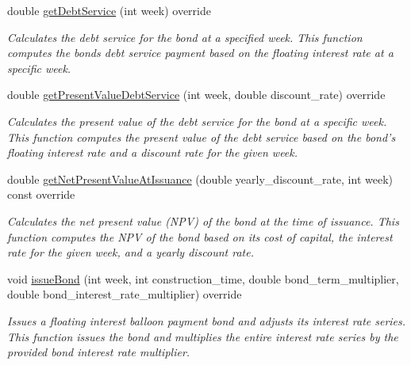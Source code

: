 \begin{DoxyCompactItemize}
double \mbox{\hyperlink{classFloatingInterestBalloonPaymentBond_a0009a0b12e0ebeb15952561513ddc901}{get\+Debt\+Service}} (int week) override
\begin{DoxyCompactList}\small\item\em Calculates the debt service for the bond at a specified week. This function computes the bond\textquotesingle{}s debt service payment based on the floating interest rate at a specific week. \end{DoxyCompactList}\item 
double \mbox{\hyperlink{classFloatingInterestBalloonPaymentBond_a91b2fef92f90049a3ba13bcd27c0eff2}{get\+Present\+Value\+Debt\+Service}} (int week, double discount\+\_\+rate) override
\begin{DoxyCompactList}\small\item\em Calculates the present value of the debt service for the bond at a specific week. This function computes the present value of the debt service based on the bond’s floating interest rate and a discount rate for the given week. \end{DoxyCompactList}\item 
double \mbox{\hyperlink{classFloatingInterestBalloonPaymentBond_a90205e26e09eef1227f8c0671ca4fce2}{get\+Net\+Present\+Value\+At\+Issuance}} (double yearly\+\_\+discount\+\_\+rate, int week) const override
\begin{DoxyCompactList}\small\item\em Calculates the net present value (N\+PV) of the bond at the time of issuance. This function computes the N\+PV of the bond based on its cost of capital, the interest rate for the given week, and a yearly discount rate. \end{DoxyCompactList}\item 
void \mbox{\hyperlink{classFloatingInterestBalloonPaymentBond_a4cf110f320c92f5eca9aed952e0b527a}{issue\+Bond}} (int week, int construction\+\_\+time, double bond\+\_\+term\+\_\+multiplier, double bond\+\_\+interest\+\_\+rate\+\_\+multiplier) override
\begin{DoxyCompactList}\small\item\em Issues a floating interest balloon payment bond and adjusts its interest rate series. This function issues the bond and multiplies the entire interest rate series by the provided bond interest rate multiplier. \end{DoxyCompactList}\end{DoxyCompactItemize}

